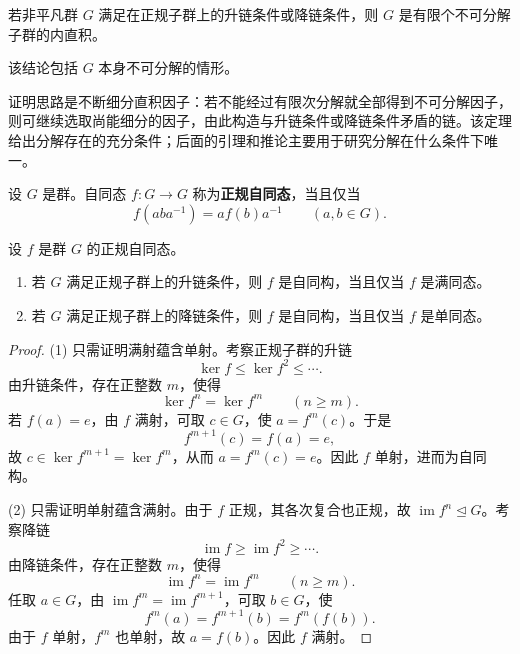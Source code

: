 \begin{theorem}\label{thm:indecomposable-decomposition-existence}
若非平凡群 $G$ 满足在正规子群上的升链条件或降链条件，则 $G$ 是有限个不可分解子群的内直积。
\end{theorem}

\begin{purplenote}
该结论包括 $G$ 本身不可分解的情形。

证明思路是不断细分直积因子：若不能经过有限次分解就全部得到不可分解因子，则可继续选取尚能细分的因子，由此构造与升链条件或降链条件矛盾的链。该定理给出分解存在的充分条件；后面的引理和推论主要用于研究分解在什么条件下唯一。
\end{purplenote}

\begin{definition}[正规自同态]\label{def:normal-endomorphism}
设 $G$ 是群。自同态 $f:G\to G$ 称为\textbf{正规自同态}，当且仅当
\[
  f(aba^{-1})=af(b)a^{-1}
  \qquad(a,b\in G).
\]
\end{definition}

\begin{lemma}\label{lem:normal-endomorphism-chain-automorphism}
设 $f$ 是群 $G$ 的正规自同态。
\begin{enumerate}[label=(\arabic*)]
  \item 若 $G$ 满足正规子群上的升链条件，则 $f$ 是自同构，当且仅当 $f$ 是满同态。
  \item 若 $G$ 满足正规子群上的降链条件，则 $f$ 是自同构，当且仅当 $f$ 是单同态。
\end{enumerate}
\end{lemma}

\begin{proof}
(1) 只需证明满射蕴含单射。考察正规子群的升链
\[
  \ker f\leq\ker f^2\leq\cdots.
\]
由升链条件，存在正整数 $m$，使得
\[
  \ker f^n=\ker f^m\qquad(n\geq m).
\]
若 $f(a)=e$，由 $f$ 满射，可取 $c\in G$，使 $a=f^m(c)$。于是
\[
  f^{m+1}(c)=f(a)=e,
\]
故 $c\in\ker f^{m+1}=\ker f^m$，从而 $a=f^m(c)=e$。因此 $f$ 单射，进而为自同构。

(2) 只需证明单射蕴含满射。由于 $f$ 正规，其各次复合也正规，故 $\operatorname{im}f^n\trianglelefteq G$。考察降链
\[
  \operatorname{im}f\geq\operatorname{im}f^2\geq\cdots.
\]
由降链条件，存在正整数 $m$，使得
\[
  \operatorname{im}f^n=\operatorname{im}f^m\qquad(n\geq m).
\]
任取 $a\in G$，由 $\operatorname{im}f^m=\operatorname{im}f^{m+1}$，可取 $b\in G$，使
\[
  f^m(a)=f^{m+1}(b)=f^m(f(b)).
\]
由于 $f$ 单射，$f^m$ 也单射，故 $a=f(b)$。因此 $f$ 满射。
\end{proof}

